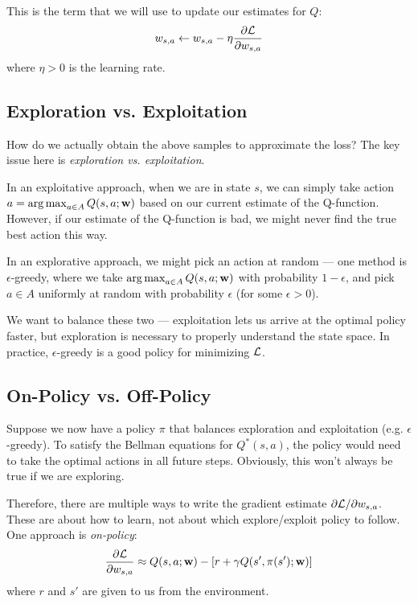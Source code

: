 \documentclass[12pt]{article}
\begin{document}
This is the term that we will use to update our estimates for $Q$:
\begin{align}
w_{s,a} \leftarrow w_{s,a} - \eta\frac{\partial \mathcal{L}}{\partial w_{s,a}}
\end{align}
where $\eta>0$ is the learning rate.

\subsection{Exploration vs. Exploitation}

How do we actually obtain the above samples to approximate the loss? The key issue here is \emph{exploration vs. exploitation}.

In an exploitative approach, when we are in state $s$, we can simply take action $a = \argmax_{a \in A} Q(s,a;\boldw)$ based on our current estimate of the Q-function. However, if our estimate of the Q-function is bad, we might never find the true best action this way.

In an explorative approach, we might pick an action at random --- one method is $\epsilon$-greedy, where we take $\argmax_{a \in A} Q(s,a;\boldw)$ with probability $1-\epsilon$, and pick $a \in A$ uniformly at random with probability $\epsilon$ (for some $\epsilon>0$).

We want to balance these two --- exploitation lets us arrive at the optimal policy faster, but exploration is necessary to properly understand the state space. In practice, $\epsilon$-greedy is a good policy for minimizing $\mathcal{L}$.

\subsection{On-Policy vs. Off-Policy}

Suppose we now have a policy $\pi$ that balances exploration and exploitation (e.g. $\epsilon$-greedy). To satisfy the Bellman equations for $Q^*(s,a)$, 
the policy would need to take the optimal actions in all future steps. Obviously, this won't always be true if we are exploring.

Therefore, there are multiple ways to write the gradient estimate $\partial \mathcal{L} / \partial w_{s,a}$. These are about how to learn, not about which explore/exploit policy to follow. One approach is \emph{on-policy}:
\begin{equation}
\frac{\partial \mathcal{L}}{\partial w_{s,a}} \approx Q(s,a;\mathbf{w}) - [r + \gamma Q(s', \pi(s'); \mathbf{w})]
\end{equation}
where $r$ and $s'$ are given to us from the environment.
\end{document}
